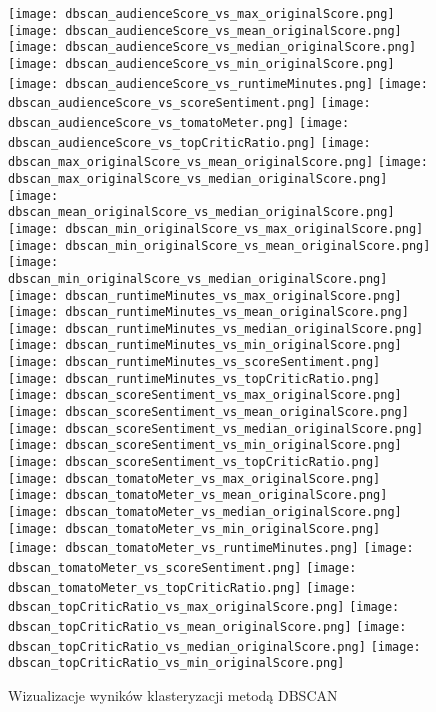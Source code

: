 \documentclass[a4paper,12pt,titlepage]{article}
\begin{document}
\begin{figure}[H]
\centering
\texttt{[image: dbscan\_audienceScore\_vs\_max\_originalScore.png]}
\texttt{[image: dbscan\_audienceScore\_vs\_mean\_originalScore.png]}
\texttt{[image: dbscan\_audienceScore\_vs\_median\_originalScore.png]}
\texttt{[image: dbscan\_audienceScore\_vs\_min\_originalScore.png]}
\texttt{[image: dbscan\_audienceScore\_vs\_runtimeMinutes.png]}
\texttt{[image: dbscan\_audienceScore\_vs\_scoreSentiment.png]}
\texttt{[image: dbscan\_audienceScore\_vs\_tomatoMeter.png]}
\texttt{[image: dbscan\_audienceScore\_vs\_topCriticRatio.png]}
\texttt{[image: dbscan\_max\_originalScore\_vs\_mean\_originalScore.png]}
\texttt{[image: dbscan\_max\_originalScore\_vs\_median\_originalScore.png]}
\texttt{[image: dbscan\_mean\_originalScore\_vs\_median\_originalScore.png]}
\texttt{[image: dbscan\_min\_originalScore\_vs\_max\_originalScore.png]}
\texttt{[image: dbscan\_min\_originalScore\_vs\_mean\_originalScore.png]}
\texttt{[image: dbscan\_min\_originalScore\_vs\_median\_originalScore.png]}
\texttt{[image: dbscan\_runtimeMinutes\_vs\_max\_originalScore.png]}
\texttt{[image: dbscan\_runtimeMinutes\_vs\_mean\_originalScore.png]}
\texttt{[image: dbscan\_runtimeMinutes\_vs\_median\_originalScore.png]}
\texttt{[image: dbscan\_runtimeMinutes\_vs\_min\_originalScore.png]}
\texttt{[image: dbscan\_runtimeMinutes\_vs\_scoreSentiment.png]}
\texttt{[image: dbscan\_runtimeMinutes\_vs\_topCriticRatio.png]}
\texttt{[image: dbscan\_scoreSentiment\_vs\_max\_originalScore.png]}
\texttt{[image: dbscan\_scoreSentiment\_vs\_mean\_originalScore.png]}
\texttt{[image: dbscan\_scoreSentiment\_vs\_median\_originalScore.png]}
\texttt{[image: dbscan\_scoreSentiment\_vs\_min\_originalScore.png]}
\texttt{[image: dbscan\_scoreSentiment\_vs\_topCriticRatio.png]}
\texttt{[image: dbscan\_tomatoMeter\_vs\_max\_originalScore.png]}
\texttt{[image: dbscan\_tomatoMeter\_vs\_mean\_originalScore.png]}
\texttt{[image: dbscan\_tomatoMeter\_vs\_median\_originalScore.png]}
\texttt{[image: dbscan\_tomatoMeter\_vs\_min\_originalScore.png]}
\texttt{[image: dbscan\_tomatoMeter\_vs\_runtimeMinutes.png]}
\texttt{[image: dbscan\_tomatoMeter\_vs\_scoreSentiment.png]}
\texttt{[image: dbscan\_tomatoMeter\_vs\_topCriticRatio.png]}
\texttt{[image: dbscan\_topCriticRatio\_vs\_max\_originalScore.png]}
\texttt{[image: dbscan\_topCriticRatio\_vs\_mean\_originalScore.png]}
\texttt{[image: dbscan\_topCriticRatio\_vs\_median\_originalScore.png]}
\texttt{[image: dbscan\_topCriticRatio\_vs\_min\_originalScore.png]}
\caption{Wizualizacje wyników klasteryzacji metodą DBSCAN}
\end{figure}
\end{document}
